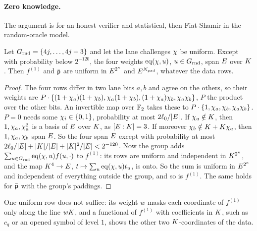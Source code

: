 \paragraph{Zero knowledge.} The argument is for an honest verifier and statistical, then Fiat-Shamir in the random-oracle model.

\begin{lemma}\label{lem:pcs-zk-group}
Let $G_{\mathrm{rnd}} = \{4j, \dots, 4j + 3\}$ and let the lane challenges $\chi$ be uniform. Except with probability below $2^{-120}$, the four weights $\operatorname{eq}(\chi, u)$, $u \in G_{\mathrm{rnd}}$, span $E$ over $K$. Then $f^{(1)}$ and $\bar{\mathsf{p}}$ are uniform in $E^{2^\kappa}$ and $E^{N_{\mathrm{pad}}}$, whatever the data rows.
\end{lemma}
\begin{proof}
The four rows differ in two lane bits $a, b$ and agree on the others, so their weights are $P \cdot \{(1 + \chi_a)(1 + \chi_b), \chi_a(1 + \chi_b), (1 + \chi_a)\chi_b, \chi_a \chi_b\}$, $P$ the product over the other bits. An invertible map over $\mathbb{F}_2$ takes these to $P \cdot \{1, \chi_a, \chi_b, \chi_a \chi_b\}$. $P = 0$ needs some $\chi_i \in \{0, 1\}$, probability at most $2\ell_0 / |E|$. If $\chi_a \notin K$, then $1, \chi_a, \chi_a^2$ is a basis of $E$ over $K$, as $[E : K] = 3$. If moreover $\chi_b \notin K + K \chi_a$, then $1, \chi_a, \chi_b$ span $E$. So the four span $E$ except with probability at most $2\ell_0/|E| + |K|/|E| + |K|^2/|E| < 2^{-120}$. Now the group adds $\sum_{u \in G_{\mathrm{rnd}}} \operatorname{eq}(\chi, u) f(u, \cdot)$ to $f^{(1)}$: its rows are uniform and independent in $K^{2^\kappa}$, and the map $K^4 \to E$, $t \mapsto \sum_u \operatorname{eq}(\chi, u) t_u$, is onto. So the sum is uniform in $E^{2^\kappa}$ and independent of everything outside the group, and so is $f^{(1)}$. The same holds for $\bar{\mathsf{p}}$ with the group's paddings.
\end{proof}

One uniform row does not suffice: its weight $w$ masks each coordinate of $f^{(1)}$ only along the line $wK$, and a functional of $f^{(1)}$ with coefficients in $K$, such as $c_q$ or an opened symbol of level $1$, shows the other two $K$-coordinates of the data.

